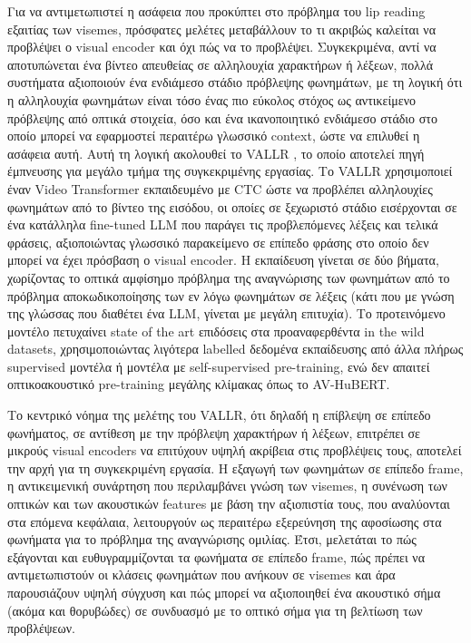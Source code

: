 Για να αντιμετωπιστεί η ασάφεια που προκύπτει στο πρόβλημα του lip reading εξαιτίας των visemes, πρόσφατες μελέτες μεταβάλλουν το τι ακριβώς καλείται να προβλέψει ο visual encoder και όχι πώς να το προβλέψει. Συγκεκριμένα, αντί να αποτυπώνεται ένα βίντεο απευθείας σε αλληλουχία χαρακτήρων ή λέξεων, πολλά συστήματα αξιοποιούν ένα ενδιάμεσο στάδιο πρόβλεψης φωνημάτων, με τη λογική ότι η αλληλουχία φωνημάτων είναι τόσο ένας πιο εύκολος στόχος ως αντικείμενο πρόβλεψης από οπτικά στοιχεία, όσο και ένα ικανοποιητικό ενδιάμεσο στάδιο στο οποίο μπορεί να εφαρμοστεί περαιτέρω γλωσσικό context, ώστε να επιλυθεί η ασάφεια αυτή. Αυτή τη λογική ακολουθεί το VALLR \cite{thomas2026vallrvisualasrlanguage}, το οποίο αποτελεί πηγή έμπνευσης για μεγάλο τμήμα της συγκεκριμένης εργασίας. Το VALLR χρησιμοποιεί έναν Video Transformer εκπαιδευμένο με CTC ώστε να προβλέπει αλληλουχίες φωνημάτων από το βίντεο της εισόδου, οι οποίες σε ξεχωριστό στάδιο εισέρχονται σε ένα κατάλληλα fine-tuned LLM που παράγει τις προβλεπόμενες λέξεις και τελικά φράσεις, αξιοποιώντας γλωσσικό παρακείμενο σε επίπεδο φράσης στο οποίο δεν μπορεί να έχει πρόσβαση ο visual encoder. Η εκπαίδευση γίνεται σε δύο βήματα, χωρίζοντας το οπτικά αμφίσημο πρόβλημα της αναγνώρισης των φωνημάτων από το πρόβλημα αποκωδικοποίησης των εν λόγω φωνημάτων σε λέξεις (κάτι που με γνώση της γλώσσας που διαθέτει ένα LLM, γίνεται με μεγάλη επιτυχία). Το προτεινόμενο μοντέλο πετυχαίνει state of the art επιδόσεις στα προαναφερθέντα in the wild datasets, χρησιμοποιώντας λιγότερα labelled δεδομένα εκπαίδευσης από άλλα πλήρως supervised μοντέλα ή μοντέλα με self-supervised pre-training, ενώ δεν απαιτεί οπτικοακουστικό pre-training μεγάλης κλίμακας όπως το AV-HuBERT.

Το κεντρικό νόημα της μελέτης του VALLR, ότι δηλαδή η επίβλεψη σε επίπεδο φωνήματος, σε αντίθεση με την πρόβλεψη χαρακτήρων ή λέξεων, επιτρέπει σε μικρούς visual encoders να επιτύχουν υψηλή ακρίβεια στις προβλέψεις τους, αποτελεί την αρχή για τη συγκεκριμένη εργασία. Η εξαγωγή των φωνημάτων σε επίπεδο frame, η αντικειμενική συνάρτηση που περιλαμβάνει γνώση των visemes, η συνένωση των οπτικών και των ακουστικών features με βάση την αξιοπιστία τους, που αναλύονται στα επόμενα κεφάλαια, λειτουργούν ως περαιτέρω εξερεύνηση της αφοσίωσης στα φωνήματα για το πρόβλημα της αναγνώρισης ομιλίας. Έτσι, μελετάται το πώς εξάγονται και ευθυγραμμίζονται τα φωνήματα σε επίπεδο frame, πώς πρέπει να αντιμετωπιστούν οι κλάσεις φωνημάτων που ανήκουν σε visemes και άρα παρουσιάζουν υψηλή σύγχυση και πώς μπορεί να αξιοποιηθεί ένα ακουστικό σήμα (ακόμα και θορυβώδες) σε συνδυασμό με το οπτικό σήμα για τη βελτίωση των προβλέψεων.